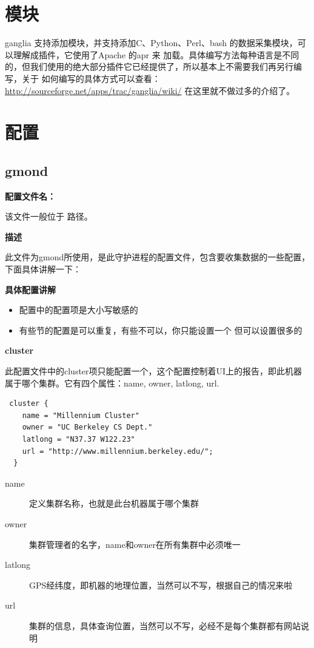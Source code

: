 \documentclass{article}
\begin{document}
\section{模块}
ganglia 支持添加模块，并支持添加C、Python、Perl、bash 的数据采集模块，可以理解成插件，它使用了Apache 的apr 来
加载。具体编写方法每种语言是不同的，但我们使用的绝大部分插件它已经提供了，所以基本上不需要我们再另行编写，关于
如何编写的具体方式可以查看：\url{http://sourceforge.net/apps/trac/ganglia/wiki/} 在这里就不做过多的介绍了。

\section{配置}
\subsection{gmond}
\textbf{配置文件名：} 

该文件一般位于 路径。

\textbf{描述}

此文件为gmond所使用，是此守护进程的配置文件，包含要收集数据的一些配置，下面具体讲解一下：

\textbf{具体配置讲解}

\begin{itemize}
\item 配置中的配置项是大小写敏感的
\item 有些节的配置是可以重复，有些不可以，你只能设置一个  但可以设置很多的
\end{itemize}

\textbf{cluster}

此配置文件中的cluster项只能配置一个，这个配置控制着UI上的报告，即此机器属于哪个集群。它有四个属性：name, owner,
latlong, url.

\begin{verbatim}
 cluster {
    name = "Millennium Cluster"
    owner = "UC Berkeley CS Dept."
    latlong = "N37.37 W122.23"
    url = "http://www.millennium.berkeley.edu/";
  }
\end{verbatim}

\begin{description}
\item[name] 定义集群名称，也就是此台机器属于哪个集群
\item[owner] 集群管理者的名字，name和owner在所有集群中必须唯一
\item[latlong] GPS经纬度，即机器的地理位置，当然可以不写，根据自己的情况来啦
\item[url] 集群的信息，具体查询位置，当然可以不写，必经不是每个集群都有网站说明
\end{description}
\end{document}
